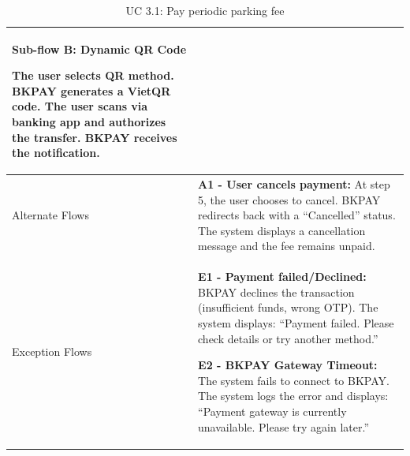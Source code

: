 \begin{table}[H]
\begin{tabularx}{\textwidth}{|>{\raggedright\arraybackslash}p{3.5cm}|>{\RaggedRight\arraybackslash}X|}
\textbf{Sub-flow B: Dynamic QR Code} \par
The user selects QR method. BKPAY generates a VietQR code. The user scans via banking app and authorizes the transfer. BKPAY receives the notification. \\
\hline
Alternate Flows & 
\textbf{A1 - User cancels payment:} At step 5, the user chooses to cancel. BKPAY redirects back with a ``Cancelled'' status. The system displays a cancellation message and the fee remains unpaid. \\
\hline
Exception Flows & 
\textbf{E1 - Payment failed/Declined:} BKPAY declines the transaction (insufficient funds, wrong OTP). The system displays: ``Payment failed. Please check details or try another method.'' \par \vspace{0.5em}
\textbf{E2 - BKPAY Gateway Timeout:} The system fails to connect to BKPAY. The system logs the error and displays: ``Payment gateway is currently unavailable. Please try again later.'' \\
\hline
\end{tabularx}
\caption{UC 3.1: Pay periodic parking fee}
\label{tab:uc3.1}
\end{table}